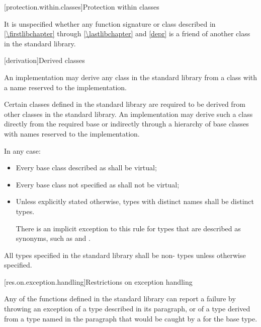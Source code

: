 [protection.within.classes]{Protection within classes}

\pnum
{}%
It is unspecified whether any function signature or class described in
\ref{\firstlibchapter} through \ref{\lastlibchapter} and \ref{depr} is a
friend of another class in the \Cpp{} standard library.

[derivation]{Derived classes}

\pnum
{}%
%
An implementation may derive any class in the \Cpp{} standard library from a class with a
name reserved to the implementation.

\pnum
Certain classes defined in the \Cpp{} standard library are required to be derived from
other classes
in the \Cpp{} standard library.
%
An implementation may derive such a class directly from the required base or indirectly
through a hierarchy of base classes with names reserved to the implementation.

\pnum
In any case:
\begin{itemize}
\item
Every base class described as
shall be virtual;
%
\item
Every base class not specified as
 shall not be virtual;
\item
Unless explicitly stated otherwise, types with distinct names shall be distinct
types.
\begin{note}
There is an implicit exception to this rule for types that are
described as synonyms, such as
 and
.
\end{note}
\end{itemize}

\pnum
All types specified in the \Cpp{} standard library shall be non- types
unless otherwise specified.

[res.on.exception.handling]{Restrictions on exception handling}%
%

\pnum
Any of the functions defined in the \Cpp{} standard library
%
can report a failure by throwing an exception of a type
described in its \throws paragraph,
or of a type derived from a type named in the \throws paragraph
that would be caught by a  for the base type.

